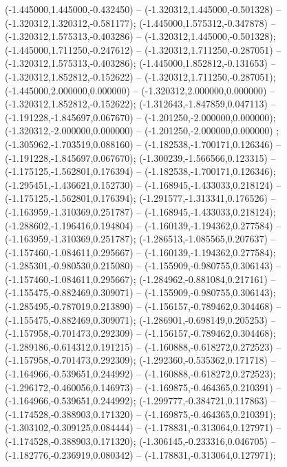  (-1.445000,1.445000,-0.432450) -- (-1.320312,1.445000,-0.501328) -- (-1.320312,1.320312,-0.581177);
 (-1.445000,1.575312,-0.347878) -- (-1.320312,1.575313,-0.403286) -- (-1.320312,1.445000,-0.501328);
 (-1.445000,1.711250,-0.247612) -- (-1.320312,1.711250,-0.287051) -- (-1.320312,1.575313,-0.403286);
 (-1.445000,1.852812,-0.131653) -- (-1.320312,1.852812,-0.152622) -- (-1.320312,1.711250,-0.287051);
 (-1.445000,2.000000,0.000000) -- (-1.320312,2.000000,0.000000) -- (-1.320312,1.852812,-0.152622);
 (-1.312643,-1.847859,0.047113) -- (-1.191228,-1.845697,0.067670) -- (-1.201250,-2.000000,0.000000);
 (-1.320312,-2.000000,0.000000) -- (-1.201250,-2.000000,0.000000) ;
 (-1.305962,-1.703519,0.088160) -- (-1.182538,-1.700171,0.126346) -- (-1.191228,-1.845697,0.067670);
 (-1.300239,-1.566566,0.123315) -- (-1.175125,-1.562801,0.176394) -- (-1.182538,-1.700171,0.126346);
 (-1.295451,-1.436621,0.152730) -- (-1.168945,-1.433033,0.218124) -- (-1.175125,-1.562801,0.176394);
 (-1.291577,-1.313341,0.176526) -- (-1.163959,-1.310369,0.251787) -- (-1.168945,-1.433033,0.218124);
 (-1.288602,-1.196416,0.194804) -- (-1.160139,-1.194362,0.277584) -- (-1.163959,-1.310369,0.251787);
 (-1.286513,-1.085565,0.207637) -- (-1.157460,-1.084611,0.295667) -- (-1.160139,-1.194362,0.277584);
 (-1.285301,-0.980530,0.215080) -- (-1.155909,-0.980755,0.306143) -- (-1.157460,-1.084611,0.295667);
 (-1.284962,-0.881084,0.217161) -- (-1.155475,-0.882469,0.309071) -- (-1.155909,-0.980755,0.306143);
 (-1.285495,-0.787019,0.213890) -- (-1.156157,-0.789462,0.304468) -- (-1.155475,-0.882469,0.309071);
 (-1.286901,-0.698149,0.205253) -- (-1.157958,-0.701473,0.292309) -- (-1.156157,-0.789462,0.304468);
 (-1.289186,-0.614312,0.191215) -- (-1.160888,-0.618272,0.272523) -- (-1.157958,-0.701473,0.292309);
 (-1.292360,-0.535362,0.171718) -- (-1.164966,-0.539651,0.244992) -- (-1.160888,-0.618272,0.272523);
 (-1.296172,-0.460056,0.146973) -- (-1.169875,-0.464365,0.210391) -- (-1.164966,-0.539651,0.244992);
 (-1.299777,-0.384721,0.117863) -- (-1.174528,-0.388903,0.171320) -- (-1.169875,-0.464365,0.210391);
 (-1.303102,-0.309125,0.084444) -- (-1.178831,-0.313064,0.127971) -- (-1.174528,-0.388903,0.171320);
 (-1.306145,-0.233316,0.046705) -- (-1.182776,-0.236919,0.080342) -- (-1.178831,-0.313064,0.127971);
